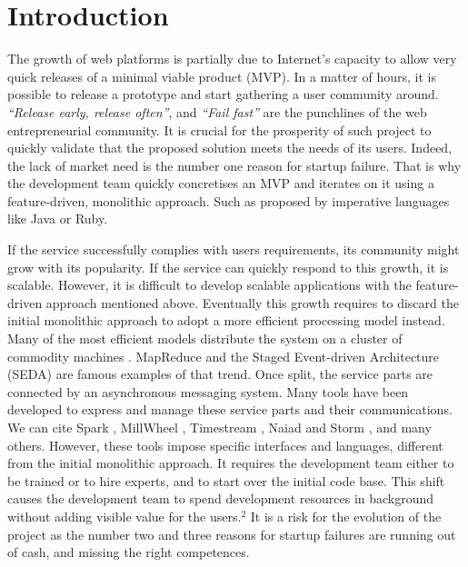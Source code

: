 \section{Introduction}

The growth of web platforms is partially due to Internet's capacity to allow very quick releases of a minimal viable product (MVP).
In a matter of hours, it is possible to release a prototype and start gathering a user community around.
\textit{``Release early, release often''}, and \textit{``Fail fast''} are the punchlines of the web entrepreneurial community.
It is crucial for the prosperity of such project to quickly validate that the proposed solution meets the needs of its users.
Indeed, the lack of market need is the number one reason for startup failure.
That is why the development team quickly concretises an MVP and iterates on it using a feature-driven, monolithic approach.
Such as proposed by imperative languages like Java or Ruby.

If the service successfully complies with users requirements, its community might grow with its popularity.
If the service can quickly respond to this growth, it is scalable.
However, it is difficult to develop scalable applications with the feature-driven approach mentioned above.
Eventually this growth requires to discard the initial monolithic approach to adopt a more efficient processing model instead.
Many of the most efficient models distribute the system on a cluster of commodity machines \cite{Fox1997}.
MapReduce \cite{Dean2008} and the Staged Event-driven Architecture (SEDA) \cite{Welsh2000} are famous examples of that trend. %
Once split, the service parts are connected by an asynchronous messaging system.
Many tools have been developed to express and manage these service parts and their communications.
We can cite Spark \cite{Zaharia2010}, MillWheel \cite{Akidau2013}, Timestream \cite{Qian2013}, Naiad \cite{McSherry} and Storm \cite{Toshniwal2014}, and many others.
However, these tools impose specific interfaces and languages, different from the initial monolithic approach.
It requires the development team either to be trained or to hire experts, and to start over the initial code base.
This shift causes the development team to spend development resources in background without adding visible value for the users.$^2$
It is a risk for the evolution of the project as the number two and three reasons for startup failures are running out of cash, and missing the right competences.

